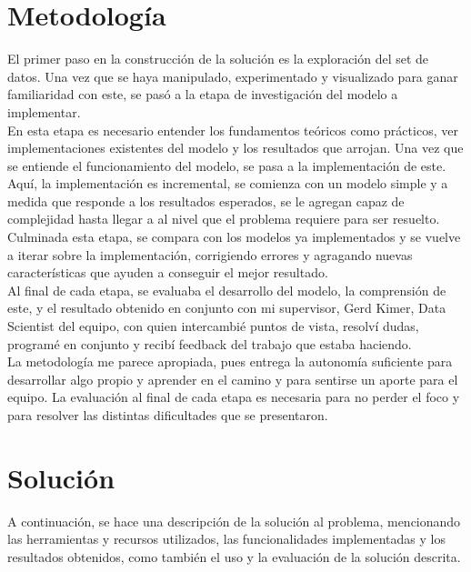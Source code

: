 \documentclass[12pt]{article}
\begin{document}
\section{Metodología}
El primer paso en la construcción de la solución es la exploración del set de datos. Una vez que se haya manipulado, experimentado y visualizado para ganar familiaridad con este, se pasó a la etapa de investigación del modelo a implementar.\\
En esta etapa es necesario entender los fundamentos teóricos como prácticos, ver implementaciones existentes del modelo y los resultados que arrojan. Una vez que se entiende el funcionamiento del modelo, se pasa a la implementación de este.\\ 
Aquí, la implementación es incremental, se comienza con un modelo simple y a medida que responde a los resultados esperados, se le agregan capaz de complejidad hasta llegar a al nivel que el problema requiere para ser resuelto.\\ 
Culminada esta etapa, se compara con los modelos ya implementados y se vuelve a iterar sobre la implementación, corrigiendo errores y agragando nuevas características que ayuden a conseguir el mejor resultado. \\

Al final de cada etapa, se evaluaba el desarrollo del modelo, la comprensión de este, y el resultado obtenido en conjunto con mi supervisor, Gerd Kimer, Data Scientist del equipo, con quien intercambié puntos de vista, resolví dudas, programé en conjunto y recibí feedback del trabajo que estaba haciendo. \\

La metodología me parece apropiada, pues entrega la autonomía suficiente para desarrollar algo propio y aprender en el camino y para sentirse un aporte para el equipo. La evaluación al final de cada etapa es necesaria para no perder el foco y para resolver las distintas dificultades que se presentaron.
\section{Solución}
A continuación, se hace una descripción de la solución al problema, mencionando las herramientas y recursos utilizados, las funcionalidades implementadas y los resultados obtenidos, como también el uso y la evaluación de la solución descrita.
\end{document}
